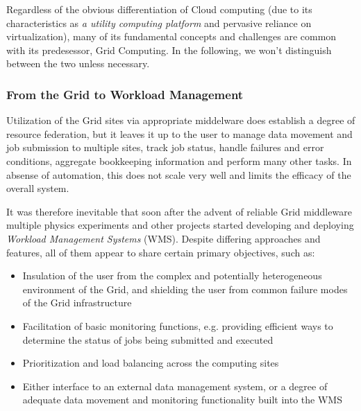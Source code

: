 Regardless of the obvious differentiation of Cloud computing (due to its characteristics as \textit{a utility computing platform} and pervasive reliance on virtualization), many of its fundamental concepts and challenges
are common with its predesessor, Grid Computing. In the following, we won't distinguish between the two unless  necessary.


%

\subsubsection{From the Grid to Workload Management}
Utilization of the Grid sites via appropriate middelware does establish a degree of resource federation, but it leaves it up to the user to manage data movement and job submission to multiple sites,
track job status, handle failures and error conditions, aggregate bookkeeping information and perform many other tasks. In absense of automation, this does not scale very well and limits the efficacy
of the overall system.

It was therefore inevitable that soon after the advent of reliable Grid middleware multiple physics experiments and other projects started developing and deploying \textit{Workload Management Systems} (WMS).
Despite differing approaches and features, all of them appear to share certain primary objectives, such as:
\begin{itemize}
\item{Insulation of the user from the complex and potentially heterogeneous environment of the Grid, and shielding the user from common failure modes of the Grid infrastructure}
\item{Facilitation of basic monitoring functions, e.g. providing efficient ways to determine the status of jobs being submitted and executed}
\item{Prioritization and load balancing across the computing sites}
\item{Either interface to an external data management system, or a degree of adequate data movement and monitoring functionality built into the WMS}
\end{itemize}

